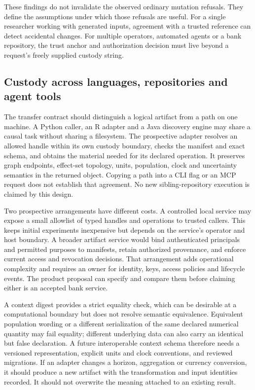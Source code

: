 These findings do not invalidate the observed ordinary mutation
refusals. They define the assumptions under which those refusals are
useful. For a single researcher working with generated inputs, agreement
with a trusted reference can detect accidental changes. For multiple
operators, automated agents or a bank repository, the trust anchor and
authorization decision must live beyond a request's freely supplied
custody string.

\hypertarget{custody-across-languages-repositories-and-agent-tools}{%
\subsection{Custody across languages, repositories and agent
tools}\label{custody-across-languages-repositories-and-agent-tools}}

The transfer contract should distinguish a logical artifact from a path
on one machine. A Python caller, an R adapter and a Java discovery
engine may share a causal task without sharing a filesystem. The
prospective adapter resolves an allowed handle within its own custody
boundary, checks the manifest and exact schema, and obtains the material
needed for its declared operation. It preserves graph endpoints,
effect-set topology, units, population, clock and uncertainty semantics
in the returned object. Copying a path into a CLI flag or an MCP request
does not establish that agreement. No new sibling-repository execution
is claimed by this design. \citep{exec14_custody_design}

Two prospective arrangements have different costs. A controlled local
service may expose a small allowlist of typed handles and operations to
trusted callers. This keeps initial experiments inexpensive but depends
on the service's operator and host boundary. A broader artifact service
would bind authenticated principals and permitted purposes to manifests,
retain authorized provenance, and enforce current access and revocation
decisions. That arrangement adds operational complexity and requires an
owner for identity, keys, access policies and lifecycle events. The
product proposal can specify and compare them before claiming either is
an accepted bank service.

A context digest provides a strict equality check, which can be
desirable at a computational boundary but does not resolve semantic
equivalence. Equivalent population wording or a different serialization
of the same declared numerical quantity may fail equality; different
underlying data can also carry an identical but false declaration. A
future interoperable context schema therefore needs a versioned
representation, explicit units and clock conventions, and reviewed
migrations. If an adapter changes a horizon, aggregation or currency
conversion, it should produce a new artifact with the transformation and
input identities recorded. It should not overwrite the meaning attached
to an existing result.

